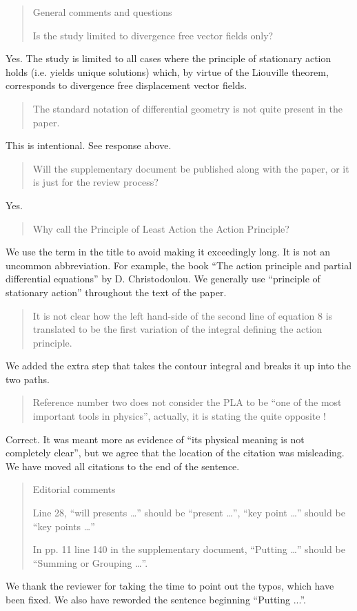 \documentclass[11pt, executivepaper]{article}
\begin{document}
 
\begin{quote}
 General comments and questions
 
 Is the study limited to divergence free vector fields only? 
\end{quote}
Yes. The study is limited to all cases where the principle of stationary action holds (i.e. yields unique solutions) which, by virtue of the Liouville theorem, corresponds to divergence free displacement vector fields.
 
\begin{quote}
 The standard notation of differential geometry is not quite present in the paper.
\end{quote}
This is intentional. See response above.

\begin{quote}
 Will the supplementary document be published along with the paper, or it is just for the review process? 
\end{quote}
Yes.

\begin{quote}
 Why call the Principle of Least Action the Action Principle? 
\end{quote}
We use the term in the title to avoid making it exceedingly long. It is not an uncommon abbreviation. For example, the book ``The action principle and partial differential equations'' by D. Christodoulou.  We generally use ``principle of stationary action'' throughout the text of the paper.

\begin{quote}
 It is not clear how the left hand-side of the second line of equation 8 is translated to be the first variation of the integral defining the action principle. 
\end{quote}
We added the extra step that takes the contour integral and breaks it up into the two paths.

\begin{quote}
 Reference number two does not consider the PLA to be “one of the most important tools in physics”, actually, it is stating the quite opposite !
\end{quote}
Correct. It was meant more as evidence of ``its physical meaning is not completely clear'', but we agree that the location of the citation was misleading. We have moved all citations to the end of the sentence.


\begin{quote}
 Editorial comments
 
 Line 28, “will presents …” should be “present …”, “key point …” should be “key points …”

 In pp. 11 line 140 in the supplementary document, “Putting …” should be “Summing or Grouping …”.
\end{quote}
We thank the reviewer for taking the time to point out the typos, which have been fixed. We also have reworded the sentence beginning ``Putting ...''.
 
\end{document}
